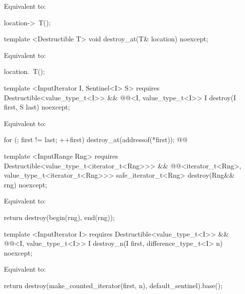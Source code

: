 \setcounter{Paras}{0}
\pnum
\effects Equivalent to:
\begin{codeblock}
    location->~T();
\end{codeblock}

{\color{addclr}
\begin{codeblock}
template <Destructible T>
void destroy_at(T& location) noexcept;
\end{codeblock}

\pnum
\effects Equivalent to:
\begin{codeblock}
    location.~T();
\end{codeblock}

\begin{codeblock}
template <InputIterator I, Sentinel<I> S>
requires
  Destructible<value_type_t<I>> &&
  @@<I, value_type_t<I>>
I destroy(I first, S last) noexcept;
\end{codeblock}
}

\pnum
\effects Equivalent to:
\begin{codeblock}
    for (; first != last; ++first)
      destroy_at(addressof(*first));
    @@
\end{codeblock}

{\color{addclr}
\begin{codeblock}
template <InputRange Rng>
requires
  Destructible<value_type_t<iterator_t<Rng>>> &&
  @@<iterator_t<Rng>, value_type_t<iterator_t<Rng>>>
safe_iterator_t<Rng> destroy(Rng&& rng) noexcept;
\end{codeblock}

\pnum
\effects Equivalent to:
\begin{codeblock}
    return destroy(begin(rng), end(rng));
\end{codeblock}

\begin{codeblock}
template <InputIterator I>
requires
  Destructible<value_type_t<I>> &&
  @@<I, value_type_t<I>>
I destroy_n(I first, difference_type_t<I> n) noexcept;
\end{codeblock}

\pnum
\effects Equivalent to:
\begin{codeblock}
    return destroy(make_counted_iterator(first, n), default_sentinel{}).base();
\end{codeblock}
} %
